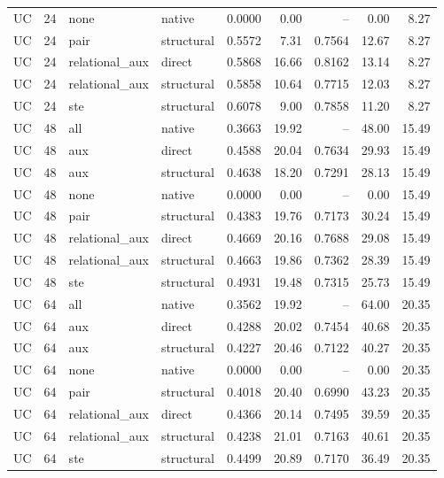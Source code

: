 \begin{longtable}{@{}lrl lrrrrr@{}}
UC & 24 & none & native & 0.0000 & 0.00 & -- & 0.00 & 8.27\\
UC & 24 & pair & structural & 0.5572 & 7.31 & 0.7564 & 12.67 & 8.27\\
UC & 24 & relational\_aux & direct & 0.5868 & 16.66 & 0.8162 & 13.14 & 8.27\\
UC & 24 & relational\_aux & structural & 0.5858 & 10.64 & 0.7715 & 12.03 & 8.27\\
UC & 24 & ste & structural & 0.6078 & 9.00 & 0.7858 & 11.20 & 8.27\\
UC & 48 & all & native & 0.3663 & 19.92 & -- & 48.00 & 15.49\\
UC & 48 & aux & direct & 0.4588 & 20.04 & 0.7634 & 29.93 & 15.49\\
UC & 48 & aux & structural & 0.4638 & 18.20 & 0.7291 & 28.13 & 15.49\\
UC & 48 & none & native & 0.0000 & 0.00 & -- & 0.00 & 15.49\\
UC & 48 & pair & structural & 0.4383 & 19.76 & 0.7173 & 30.24 & 15.49\\
UC & 48 & relational\_aux & direct & 0.4669 & 20.16 & 0.7688 & 29.08 & 15.49\\
UC & 48 & relational\_aux & structural & 0.4663 & 19.86 & 0.7362 & 28.39 & 15.49\\
UC & 48 & ste & structural & 0.4931 & 19.48 & 0.7315 & 25.73 & 15.49\\
UC & 64 & all & native & 0.3562 & 19.92 & -- & 64.00 & 20.35\\
UC & 64 & aux & direct & 0.4288 & 20.02 & 0.7454 & 40.68 & 20.35\\
UC & 64 & aux & structural & 0.4227 & 20.46 & 0.7122 & 40.27 & 20.35\\
UC & 64 & none & native & 0.0000 & 0.00 & -- & 0.00 & 20.35\\
UC & 64 & pair & structural & 0.4018 & 20.40 & 0.6990 & 43.23 & 20.35\\
UC & 64 & relational\_aux & direct & 0.4366 & 20.14 & 0.7495 & 39.59 & 20.35\\
UC & 64 & relational\_aux & structural & 0.4238 & 21.01 & 0.7163 & 40.61 & 20.35\\
UC & 64 & ste & structural & 0.4499 & 20.89 & 0.7170 & 36.49 & 20.35\\
\bottomrule
\end{longtable}
